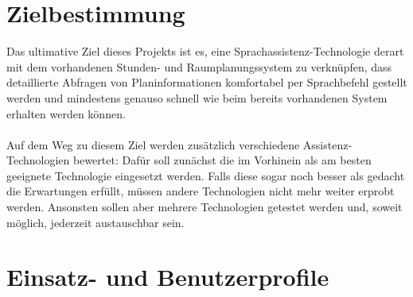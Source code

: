 \documentclass[12pt, a4paper]{scrartcl}
\begin{document}
\section{Zielbestimmung}
Das ultimative Ziel dieses Projekts ist es, eine Sprachassistenz-Technologie derart mit dem vorhandenen Stunden- und Raumplanungssystem zu verknüpfen, dass detaillierte Abfragen von Planinformationen komfortabel per Sprachbefehl gestellt werden und mindestens genauso schnell wie beim bereits vorhandenen System erhalten werden können.\\
\\
Auf dem Weg zu diesem Ziel werden zusätzlich verschiedene Assistenz-Technologien bewertet: Dafür soll zunächst die im Vorhinein als am besten geeignete Technologie eingesetzt werden. Falls diese sogar noch besser als gedacht die Erwartungen erfüllt, müssen andere Technologien nicht mehr weiter erprobt werden. Ansonsten sollen aber mehrere Technologien getestet werden und, soweit möglich, jederzeit austauschbar sein.

\newpage

\section{Einsatz- und Benutzerprofile}
\end{document}
